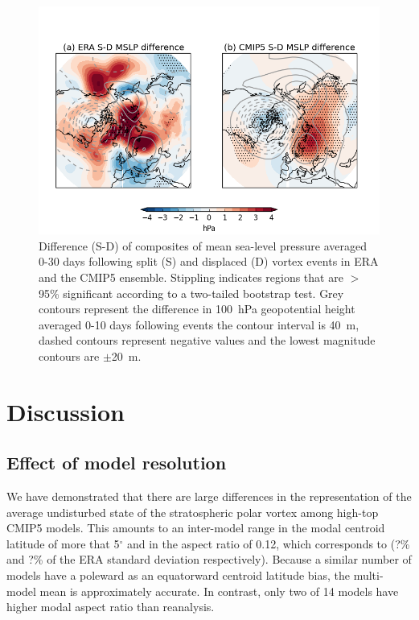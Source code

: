 \begin{figure}
 \centering
 \noindent\includegraphics[width=\textwidth]{figures/chapter-models/mslp_diff.png}
 \caption[Difference of MSLP following split and displaced vortex
 events.]{Difference (S-D) of composites of mean sea-level pressure averaged
   0-30 days following split (S) and displaced (D) vortex events in ERA and the
   CMIP5 ensemble. Stippling indicates regions that are $>$95\% significant
   according to a two-tailed bootstrap test. Grey contours represent the
   difference in 100~hPa geopotential height averaged 0-10 days following events
   the contour interval is 40~m, dashed contours represent negative values and
   the lowest magnitude contours are $\pm$20~m. }
 \label{fig:cmip5_mslp_diff}
\end{figure}





\section{Discussion}
\subsection{Effect of model resolution}

We have demonstrated that there are large differences in the representation of
the average undisturbed state of the stratospheric polar vortex among high-top
CMIP5 models. This amounts to an inter-model range in the modal centroid
latitude of more that 5$^{\circ}$ and in the aspect ratio of 0.12, which
corresponds to (?\% and ?\% of the ERA standard deviation respectively). Because
a similar number of models have a poleward as an equatorward centroid latitude
bias, the multi-model mean is approximately accurate. In contrast, only two of
14 models have higher modal aspect ratio than reanalysis.

